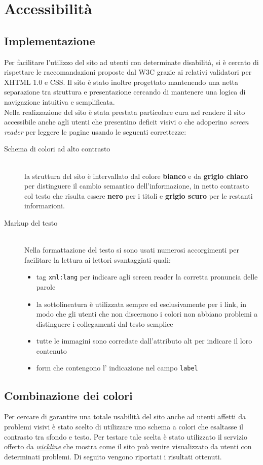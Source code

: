 \documentclass[11pt]{article}
\begin{document}
\newpage
\section{Accessibilità}
\label{sec:Accessibilita}
\subsection{Implementazione}
Per facilitare l'utilizzo del sito ad utenti con determinate disabilità, si è cercato di rispettare le raccomandazioni proposte dal W3C grazie ai relativi validatori per XHTML 1.0 e CSS. Il sito è stato inoltre progettato mantenendo una netta separazione tra struttura e presentazione cercando di mantenere una logica di navigazione intuitiva e semplificata.
\hfill\\
Nella realizzazione del sito è stata prestata particolare cura nel rendere il sito accessibile anche agli utenti che presentino deficit visivi o che adoperino \textit{screen reader} per leggere le pagine usando le seguenti correttezze:
\begin{description}
	\item[Schema di colori ad alto contrasto]\hfill\\
	 la struttura del sito è intervallato dal colore \textbf{bianco} e da \textbf{grigio chiaro} per distinguere il cambio semantico dell'informazione, in netto contrasto col testo che risulta essere \textbf{nero }per i titoli e \textbf{grigio scuro} per le restanti informazioni.
	\item[Markup del testo] \hfill \\
	Nella formattazione del testo si sono usati numerosi accorgimenti per facilitare la lettura ai lettori svantaggiati quali:
	\begin{itemize}
		\item tag \texttt{xml:lang} per indicare agli screen reader la corretta pronuncia delle parole
		\item la sottolineatura è utilizzata sempre ed esclusivamente per i link, in modo che gli utenti che non discernono i colori non abbiano problemi a distinguere i collegamenti dal testo semplice
		\item tutte le immagini sono corredate dall'attributo alt per indicare il loro contenuto
		\item form che contengono l' indicazione nel campo \texttt{label}
	\end{itemize}
\end{description}

\subsection{Combinazione dei colori}
Per cercare di garantire una totale usabilità del sito anche ad utenti affetti da problemi visivi è stato scelto di utilizzare uno schema a colori che esaltasse il contrasto tra sfondo e testo. Per testare tale scelta è stato utilizzato il servizio offerto da \href{http://colorfilter.wickline.org/}{\textit{wickline}} che mostra come il sito può venire visualizzato da utenti con determinati problemi. Di seguito vengono riportati i risultati ottenuti.
\newpage
\end{document}
